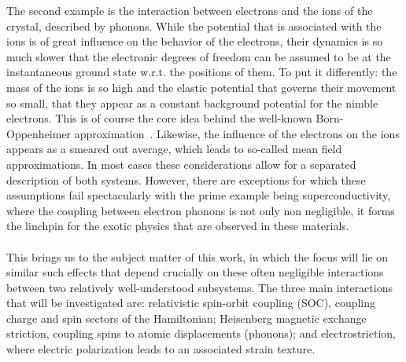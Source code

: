 The second example is the interaction between electrons and the ions of the crystal, described by phonons.
While the potential that is associated with the ions is of great influence on the behavior of the electrons, their dynamics is so much slower that the electronic degrees of freedom can be assumed to be at the instantaneous ground state w.r.t. the positions of them.
To put it differently: the mass of the ions is so high and the elastic potential that governs their movement so small, that they appear as a constant background potential for the nimble electrons.
This is of course the core idea behind the well-known Born-Oppenheimer approximation~\cite{Born1927}.
Likewise, the influence of the electrons on the ions appears as a smeared out average, which leads to so-called mean field approximations.
In most cases these considerations allow for a separated description of both systems.
However, there are exceptions for which these assumptions fail spectacularly with the prime example being superconductivity, where the coupling between electron phonons is not only non negligible, it forms the linchpin for the exotic physics that are observed in these materials.
\\\\
This brings us to the subject matter of this work, in which the focus will lie on similar such effects that depend crucially on these often negligible interactions between two relatively well-understood subsystems.
The three main interactions that will be investigated are: relativistic spin-orbit coupling (SOC), coupling charge and spin sectors of the Hamiltonian; Heisenberg magnetic exchange striction, coupling spins to atomic displacements (phonons); and electrostriction, where electric polarization leads to an associated strain texture.

